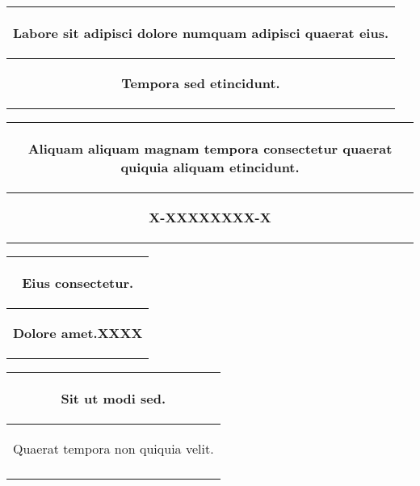 \documentclass[a4paper,landscape]{article}%
\begin{document}
\linebreak%
\linebreak%
\linebreak%
\begin{tabular}{|m{100cm}|}%
\hline%
\multicolumn{1}{|c|}{\begin{footnotesize}%
Labore sit adipisci dolore numquam adipisci quaerat eius.%
\end{footnotesize}}\\%
\hline%
\multicolumn{1}{|c|}{\begin{small}%
\textbf{Tempora sed etincidunt.}%
\end{small}}\\%
\hline%
\end{tabular}%
\hspace*{50pt}%
\begin{tabular}{|m{100cm}|}%
\hline%
\multicolumn{1}{|c|}{\begin{footnotesize}%
Aliquam aliquam magnam tempora consectetur quaerat quiquia aliquam etincidunt.%
\end{footnotesize}}\\%
\hline%
\multicolumn{1}{|c|}{\begin{small}%
\textbf{X{-}XXXXXXXX{-}X}%
\end{small}}\\%
\hline%
\end{tabular}%
\hspace*{56pt}%
\begin{tabular}{|m{100cm}|}%
\hline%
\multicolumn{1}{|c|}{\begin{footnotesize}%
Eius consectetur.%
\end{footnotesize}}\\%
\hline%
\multicolumn{1}{|c|}{\begin{small}%
\textbf{Dolore amet.XXXX}%
\end{small}}\\%
\hline%
\end{tabular}%
\linebreak%
\linebreak%
\linebreak%
\begin{tabular}{m{27.71cm}}%
\hline%
\multicolumn{1}{|c|}{\begin{footnotesize}%
Sit ut modi sed.%
\end{footnotesize}}\\%
\hline%
\multicolumn{1}{|c|}{\begin{small}%
Quaerat tempora non quiquia velit.%
\end{small}}\\%
\hline%
\\%
\end{tabular}%
\end{document}

